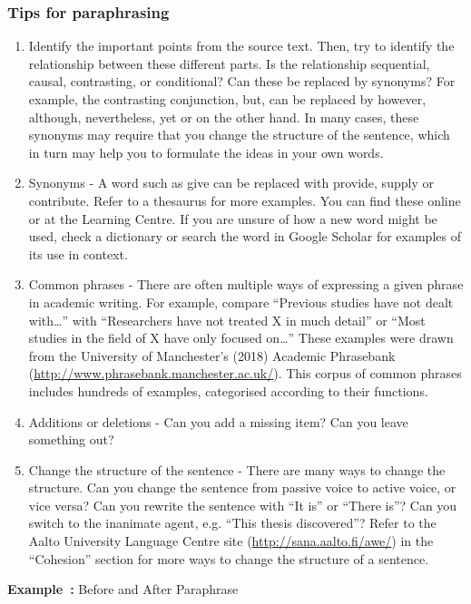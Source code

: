 \documentclass[english, 12pt, a4paper, biz, utf8, a-2b, online]{aaltothesis}
\begin{document}
\subsubsection*{Tips for paraphrasing}

\begin{enumerate}
	\item Identify the important points from the source text. Then, try to 
	identify the relationship between these different parts. Is the relationship
	sequential, causal, contrasting, or conditional? Can these be replaced by 
	synonyms? For example, the contrasting conjunction, but, can be replaced by 
	however, although, nevertheless, yet or on the other hand. In many cases, 
	these synonyms may require that you change the structure of the sentence, 
	which in turn may help you to formulate the ideas in your own words.
	\item Synonyms - A word such as give can be replaced with provide, supply or
	contribute. Refer to a thesaurus for more examples. You can find these 
	online or at the Learning Centre. If you are unsure of how a new word might 
	be used, check a dictionary or search the word in Google Scholar for 
	examples of its use in context.
	\item Common phrases - There are often multiple ways of expressing a given 
	phrase in academic writing. For example, compare “Previous studies have not 
	dealt with\ldots” with “Researchers have not treated X in much detail” or 
	“Most studies in the field of X have only focused on\ldots” These examples 
	were drawn from the University of Manchester’s (2018) Academic Phrasebank  (\url{http://www.phrasebank.manchester.ac.uk/}). This corpus of common 
	phrases includes hundreds of examples, categorised according to their 
	functions.
	\item Additions or deletions - Can you add a missing item? Can you leave 
	something out?
	\item Change the structure of the sentence - There are many ways to change 
	the structure. Can you change the sentence from passive voice to active 
	voice, or vice versa? Can you rewrite the sentence with “It is” or “There 
	is”? Can you switch to the inanimate agent, e.g. “This thesis discovered”? 
	Refer to the Aalto University Language Centre site 
	(\url{http://sana.aalto.fi/awe/}) in the “Cohesion” section for more ways to
	change the structure of a sentence.
\end{enumerate}

\vspace{1em}
\noindent
{}
\textsf{\textbf{Example~\theexample:}} Before and After Paraphrase
\end{document}
